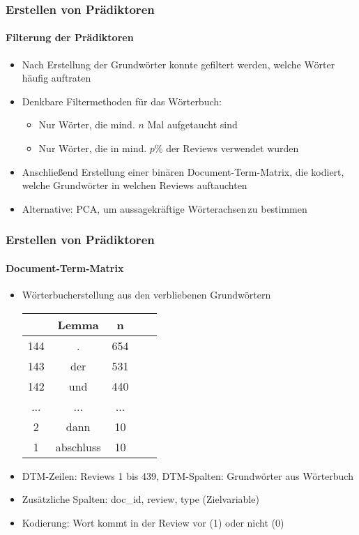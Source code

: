 \begin{frame}
\frametitle{Erstellen von Prädiktoren}
\framesubtitle{Filterung der Prädiktoren}
\begin{itemize}\itemsep12pt
\item Nach Erstellung der Grundwörter konnte gefiltert werden, welche Wörter häufig auftraten
\item Denkbare Filtermethoden für das Wörterbuch:
\begin{itemize}
\item Nur Wörter, die mind. $n$ Mal aufgetaucht sind 
\item Nur Wörter, die in mind. $p\%$ der Reviews verwendet wurden
\end{itemize} 
\item Anschließend Erstellung einer binären Document-Term-Matrix, die kodiert, welche Grundwörter in welchen Reviews auftauchten
\item Alternative: PCA, um aussagekräftige \glqq Wörterachsen\grqq \,zu bestimmen
\end{itemize}
\end{frame}

\begin{frame}
\frametitle{Erstellen von Prädiktoren}
\framesubtitle{Document-Term-Matrix}
\begin{itemize}\itemsep12pt
\item Wörterbucherstellung aus den verbliebenen Grundwörtern\\
\begin{center}
\begin{tabular}{|c|c|c|c|c|}
\hline
		& Lemma 	& n	\\
\hline
144 	& .		& 654\\
143	 	& der	& 531\\
142 	& und	& 440\\
...		& ...	& ...\\
2		& dann & 10\\
1		& abschluss & 10\\
\hline
\end{tabular}
 \end{center}

\item DTM-Zeilen: Reviews 1 bis 439, DTM-Spalten: Grundwörter aus Wörterbuch
\item Zusätzliche Spalten: doc\_id, review, type (Zielvariable) 
\item Kodierung: Wort kommt in der Review vor (1) oder nicht (0)
\end{itemize}
\end{frame}

